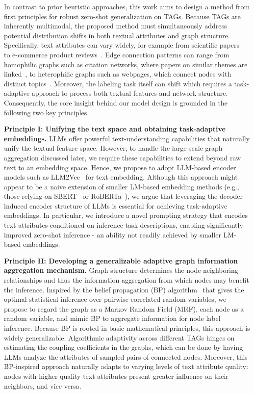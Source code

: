 In contrast to prior heuristic approaches, this work aims to design a method from first principles for robust zero-shot generalization on TAGs. Because TAGs are inherently multimodal, the proposed method must simultaneously address potential distribution shifts in both textual attributes and graph structure. Specifically, text attributes can vary widely, for example from scientific papers~\cite{mccallum2000automating} to e-commerce product reviews~\cite{ni2019justifying}. Edge connection patterns can range from homophilic graphs such as citation networks, where papers on similar themes are linked~\cite{giles1998citeseer}, to heterophilic graphs such as webpages, which connect nodes with distinct topics~\cite{mernyei2020wiki}. Moreover, the labeling task itself can shift which requires a task-adaptive approach to process both textual features and network structure. Consequently, the core insight behind our model design is grounded in the following two key principles.

\textbf{Principle I: Unifying the text space and obtaining task-adaptive embeddings.} LLMs  offer powerful text-understanding capabilities that naturally unify the textual feature space. However, to handle the large-scale graph aggregation discussed later, we require these capabilities to extend beyond raw text to an embedding space. Hence, we propose to adopt LLM-based encoder models such as LLM2Vec~\cite{behnamghader2024llm2vec, li2024making} for text embedding. Although this approach might appear to be a naive extension of smaller LM-based embedding methods (e.g., those relying on SBERT~\cite{reimers2019sentence} or RoBERTa~\cite{liu2019roberta}), we argue that leveraging the decoder-induced encoder structure of LLMs is essential for achieving task-adaptive embeddings. In particular, we introduce a novel prompting strategy that encodes text attributes conditioned on inference-task descriptions, enabling significantly improved zero-shot inference - an ability not readily achieved by smaller LM-based embeddings.

\textbf{Principle II: Developing a generalizable adaptive graph information aggregation mechanism.} Graph structure determines the node neighboring relationships and thus the information aggregation from which nodes may benefit the inference. Inspired by the belief propagation (BP) algorithm~\cite{murphy2013loopy} that gives the optimal statistical inference over pairwise correlated random variables, we propose to regard the graph as a Markov Random Field (MRF), each node as a random variable, and mimic BP to aggregate information for node label inference. Because BP is rooted in basic mathematical principles, this approach is widely generalizable. Algorithmic adaptivity across different TAGs hinges on estimating the coupling coefficients in the graphs, which can be done by having LLMs analyze the attributes of sampled pairs of connected nodes. Moreover, this BP-inspired approach naturally adapts to varying levels of text attribute quality: nodes with higher-quality text attributes present greater influence on their neighbors, and vice versa.


